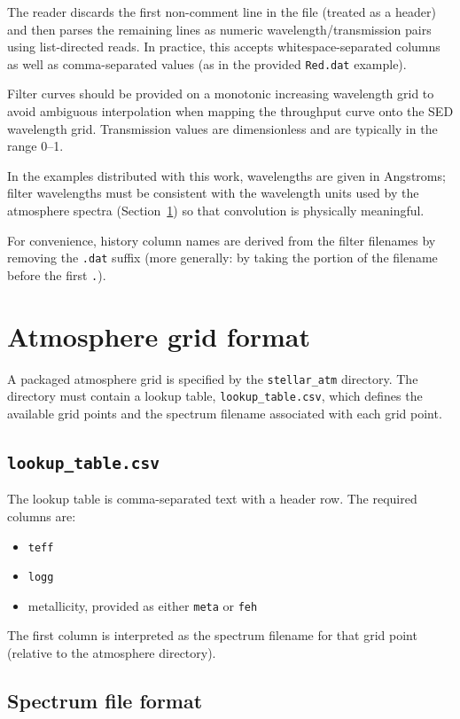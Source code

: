 \documentclass[linenumbers,apj,twocolumn, floatfix]{aastex701} \usepackage{amsmath} \usepackage{longtable} \usepackage{graphicx} \usepackage{ulem} \usepackage{xcolor} \usepackage{lettrine} \usepackage{yfonts} \usepackage{rotating}
\begin{document}
The reader discards the first non-comment line in the file (treated as a header) and then parses the remaining lines as numeric wavelength/transmission pairs using list-directed reads.
In practice, this accepts whitespace-separated columns as well as comma-separated values (as in the provided \texttt{Red.dat} example).

Filter curves should be provided on a monotonic increasing wavelength grid to avoid ambiguous interpolation when mapping the throughput curve onto the SED wavelength grid.
Transmission values are dimensionless and are typically in the range 0--1.

In the examples distributed with this work, wavelengths are given in Angstroms; filter wavelengths must be consistent with the wavelength units used by the atmosphere spectra (Section~\ref{sec:atm_grid_format}) so that convolution is physically meaningful.

For convenience, history column names are derived from the filter filenames by removing the \texttt{.dat} suffix (more generally: by taking the portion of the filename before the first \texttt{.}).

\section{Atmosphere grid format}
\label{sec:atm_grid_format}

A packaged atmosphere grid is specified by the \texttt{stellar\_atm} directory.
The directory must contain a lookup table, \texttt{lookup\_table.csv}, which defines the available grid points and the spectrum filename associated with each grid point.

\subsection{\texttt{lookup\_table.csv}}

The lookup table is comma-separated text with a header row. The required columns are:
\begin{itemize}
  \item \texttt{teff}
  \item \texttt{logg}
  \item metallicity, provided as either \texttt{meta} or \texttt{feh}
\end{itemize}
The first column is interpreted as the spectrum filename for that grid point (relative to the atmosphere directory).

\subsection{Spectrum file format}
\end{document}
